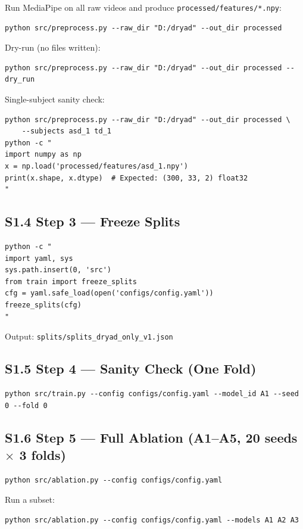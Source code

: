\documentclass[12pt,a4paper]{article}
\begin{document}
Run MediaPipe on all raw videos and produce \texttt{processed/features/*.npy}:
\begin{verbatim}
python src/preprocess.py --raw_dir "D:/dryad" --out_dir processed
\end{verbatim}

Dry-run (no files written):
\begin{verbatim}
python src/preprocess.py --raw_dir "D:/dryad" --out_dir processed --dry_run
\end{verbatim}

Single-subject sanity check:
\begin{verbatim}
python src/preprocess.py --raw_dir "D:/dryad" --out_dir processed \
    --subjects asd_1 td_1
python -c "
import numpy as np
x = np.load('processed/features/asd_1.npy')
print(x.shape, x.dtype)  # Expected: (300, 33, 2) float32
"
\end{verbatim}

\subsection{S1.4 Step 3 --- Freeze Splits}

\begin{verbatim}
python -c "
import yaml, sys
sys.path.insert(0, 'src')
from train import freeze_splits
cfg = yaml.safe_load(open('configs/config.yaml'))
freeze_splits(cfg)
"
\end{verbatim}

Output: \texttt{splits/splits\_dryad\_only\_v1.json}

\subsection{S1.5 Step 4 --- Sanity Check (One Fold)}

\begin{verbatim}
python src/train.py --config configs/config.yaml --model_id A1 --seed 0 --fold 0
\end{verbatim}

\subsection{S1.6 Step 5 --- Full Ablation (A1--A5, 20 seeds $\times$ 3 folds)}

\begin{verbatim}
python src/ablation.py --config configs/config.yaml
\end{verbatim}

Run a subset:
\begin{verbatim}
python src/ablation.py --config configs/config.yaml --models A1 A2 A3
\end{verbatim}
\end{document}
